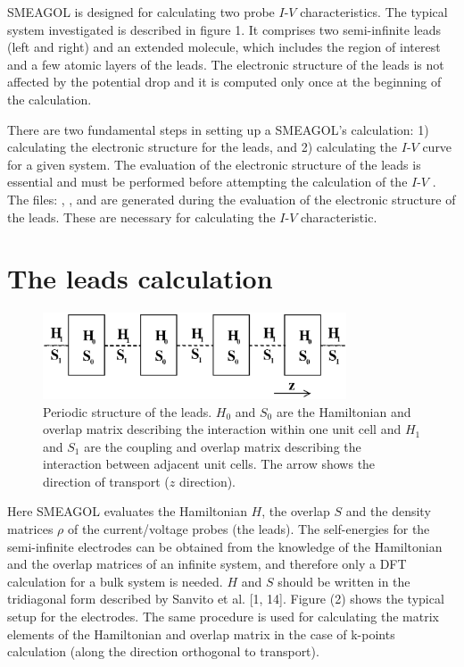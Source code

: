\documentclass[11pt]{article}
\begin{document}
SMEAGOL is designed for calculating two probe $I$-$V$ characteristics. The typical system investigated is described in figure 1. It comprises two semi-infinite leads (left and right) and an extended molecule, which includes the region of interest and a few atomic layers of the leads.  The electronic structure of the leads is not affected by the potential drop and it is computed only once at the beginning of the calculation.

There are two fundamental steps in setting up a SMEAGOL's calculation: 1) calculating the electronic structure for the leads, and 2) calculating the $I$-$V$ curve for a given system. The evaluation of the electronic structure of the leads is essential and must be performed before attempting the calculation of the $I$-$V$ . The files: , ,  and  are generated during the evaluation of the electronic structure of the leads. These are necessary for calculating the $I$-$V$ characteristic.

\section{The leads calculation}
\begin{figure}
\center
\includegraphics[width=9.0cm,clip=true]{fig/Fig2}
\caption{Periodic structure of the leads. $H_0$ and $S_0$ are the Hamiltonian and overlap matrix describing
the interaction within one unit cell and $H_1$ and $S_1$ are the coupling and overlap matrix describing the
interaction between adjacent unit cells. The arrow shows the direction of transport ($z$ direction).
}
\label{fig:leads}
\end{figure}


Here SMEAGOL evaluates the Hamiltonian $H$, the overlap $S$ and the density matrices $\rho$ of the current/voltage probes (the leads). The self-energies for the semi-infinite electrodes can be obtained from the knowledge of the Hamiltonian and the overlap matrices of an infinite system, and therefore only a DFT calculation for a bulk system is needed. $H$ and $S$ should be written in the tridiagonal form described by Sanvito et al. [1, 14]. Figure (2) shows the typical setup for the electrodes.  The same procedure is used for calculating the matrix elements of the Hamiltonian and overlap matrix in the case of k-points calculation (along the direction orthogonal to transport).
\end{document}
